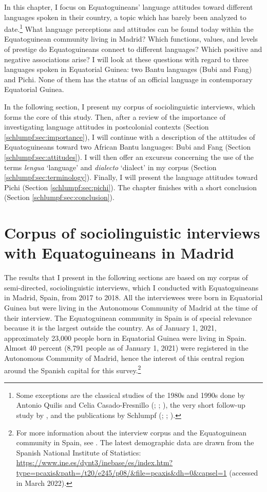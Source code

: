 \documentclass[output=paper]{langscibook}
\begin{document}
In this chapter, I focus on Equatoguineans’ language attitudes toward different languages spoken in their country, a topic which has barely been analyzed to date.\footnote{Some exceptions are the classical studies of the 1980s and 1990s done by Antonio Quilis and Celia Casado-Fresnillo (\citealt{quilis_actitud_1983}; \citeyear{quilis_nuevos_1988}; \citealt{quilis_lengua_1993}), the very short follow-up study by \citet{chirila_identidad_2015}, and the publications by Schlumpf (\citeyear{schlumpf_guineoecuatorianos_2018}; \citeyear{schlumpf_african_2020}; \citeyear{schlumpf_espanol_2020}).}  What language perceptions and attitudes can be found today within the Equatoguinean community living in Madrid? Which functions, values, and levels of prestige do Equatoguineans connect to different languages? Which positive and negative associations arise? I will look at these questions with regard to three languages spoken in Equatorial Guinea: two Bantu languages (Bubi and Fang) and Pichi. None of them has the status of an official language in contemporary Equatorial Guinea.

In the following section, I present my corpus of sociolinguistic interviews, which forms the core of this study. Then, after a review of the importance of investigating language attitudes in postcolonial contexts (Section \ref{schlumpf:sec:importance}), I will continue with a description of the attitudes of Equatoguineans toward two African Bantu languages: Bubi and Fang (Section \ref{schlumpf:sec:attitudes}). I will then offer an excursus concerning the use of the terms \textit{lengua} ‘language’ and \textit{dialecto} ‘dialect’ in my corpus (Section \ref{schlumpf:sec:terminology}). Finally, I will present the language attitudes toward Pichi (Section \ref{schlumpf:sec:pichi}). The chapter finishes with a short conclusion (Section \ref{schlumpf:sec:conclusion}).

\section{Corpus of sociolinguistic interviews with Equatoguineans in Madrid}
\label{schlumpf:sec:corpus}

The results that I present in the following sections are based on my corpus of semi-directed, sociolinguistic interviews, which I conducted with Equatoguineans in Madrid, Spain, from 2017 to 2018. All the interviewees were born in Equatorial Guinea but were living in the Autonomous Community of Madrid at the time of their interview. The Equatoguinean community in Spain is of special relevance because it is the largest outside the country. As of January 1, 2021, approximately 23,000 people born in Equatorial Guinea were living in Spain. Almost 40 percent (8,791 people as of January 1, 2021) were registered in the Autonomous Community of Madrid, hence the interest of this central region around the Spanish capital for this survey.\footnote{For more information about the interview corpus and the Equatoguinean community in Spain, see \citet[349-358]{schlumpf_spanisch_2021}. The latest demographic data are drawn from the Spanish National Institute of Statistics: \url{https://www.ine.es/dynt3/inebase/es/index.htm?type=pcaxis&path=/t20/e245/p08/&file=pcaxis&dh=0&capsel=1} (accessed in March 2022).} 
\end{document}
